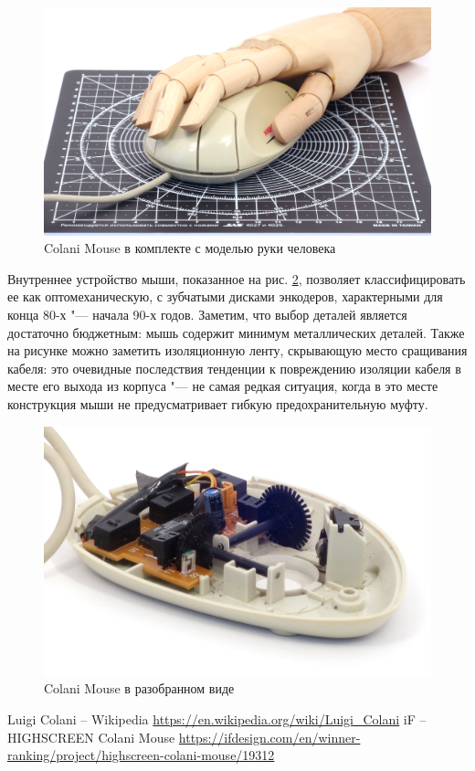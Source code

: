 \documentclass[11pt, a4paper]{article}
\begin{document}
\begin{figure}[h]
    \centering
    \includegraphics[scale=0.45]{1993_colani_mouse/hand_30.jpg}
    \caption{Colani Mouse в комплекте с моделью руки человека}
    \label{fig:ColaniMouseHand}
\end{figure}

Внутреннее устройство мыши, показанное на рис. \ref{fig:ColaniMouseInside}, позволяет классифицировать ее как оптомеханическую, с зубчатыми дисками энкодеров, характерными для конца 80-х "--- начала 90-х годов. Заметим, что выбор деталей является достаточно бюджетным: мышь содержит минимум металлических деталей. Также на рисунке можно заметить изоляционную ленту, скрывающую место сращивания кабеля: это очевидные последствия тенденции к повреждению изоляции кабеля в месте его выхода из корпуса "--- не самая редкая ситуация, когда в это месте конструкция мыши не  предусматривает гибкую предохранительную муфту.

\begin{figure}[h]
    \centering
    \includegraphics[scale=0.9]{1993_colani_mouse/inside_60.jpg}
    \caption{Colani Mouse в разобранном виде}
    \label{fig:ColaniMouseInside}
\end{figure}

\begin{thebibliography}{9}
     Luigi Colani – Wikipedia \url{https://en.wikipedia.org/wiki/Luigi_Colani}
     iF – HIGHSCREEN Colani Mouse \url{https://ifdesign.com/en/winner-ranking/project/highscreen-colani-mouse/19312}
\end{thebibliography}
\end{document}
